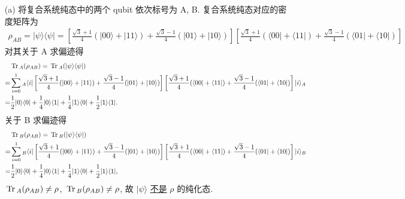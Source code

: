 \documentclass{assignment}
\begin{document}
\begin{sol}
    \begin{itemize}
        \item[(a)] 将复合系统纯态中的两个 qubit 依次标号为 A, B. 复合系统纯态对应的密度矩阵为
        \begin{align}
            \rho_{AB}=\lvert\psi\rangle\langle\psi\rvert=\left[\frac{\sqrt{3}+1}{4}(\lvert 00\rangle+\lvert 11\rangle)+\frac{\sqrt{3}-1}{4}(\lvert 01\rangle+\lvert 10\rangle)\right]\left[\frac{\sqrt{3}+1}{4}(\langle 00\rvert+\langle 11\rvert)+\frac{\sqrt{3}-1}{4}(\langle 01\rvert+\langle 10\rvert)\right]
        \end{align}
        对其关于 A 求偏迹得
        \begin{align}
            \notag&\,\mathrm{Tr}\,_A(\rho_{AB})=\,\mathrm{Tr}\,_A(\lvert\psi\rangle\langle\psi\rvert)\\
            \notag=&\sum_{i=0}^1{}_A\langle i\rvert\left[\frac{\sqrt{3}+1}{4}(\lvert 00\rangle+\lvert 11\rangle)+\frac{\sqrt{3}-1}{4}(\lvert 01\rangle+\lvert 10\rangle)\right]\left[\frac{\sqrt{3}+1}{4}(\langle 00\rvert+\langle 11\rvert)+\frac{\sqrt{3}-1}{4}(\langle 01\rvert+\langle 10\rvert)\right]\lvert i\rangle_A\\
            =&\frac{1}{2}\lvert 0\rangle\langle 0\rvert+\frac{1}{4}\lvert 0\rangle\langle 1\rvert+\frac{1}{4}\lvert 1\rangle\langle 0\rvert+\frac{1}{2}\lvert 1\rangle\langle 1\rvert.
        \end{align}
        关于 B 求偏迹得
        \begin{align}
            \notag&\,\mathrm{Tr}\,_B(\rho_{AB})=\,\mathrm{Tr}\,_B(\lvert\psi\rangle\langle\psi\rvert)\\
            \notag=&\sum_{i=0}^1{}_B\langle i\rvert\left[\frac{\sqrt{3}+1}{4}(\lvert 00\rangle+\lvert 11\rangle)+\frac{\sqrt{3}-1}{4}(\lvert 01\rangle+\lvert 10\rangle)\right]\left[\frac{\sqrt{3}+1}{4}(\langle 00\rvert+\langle 11\rvert)+\frac{\sqrt{3}-1}{4}(\langle 01\rvert+\langle 10\rvert)\right]\lvert i\rangle_B\\
            =&\frac{1}{2}\lvert 0\rangle\langle 0\rvert+\frac{1}{4}\lvert 0\rangle\langle 1\rvert+\frac{1}{4}\lvert 1\rangle\langle 0\rvert+\frac{1}{2}\lvert 1\rangle\langle 1\rvert,
        \end{align}
        $\,\mathrm{Tr}\,_A(\rho_{AB})\neq\rho$, $\,\mathrm{Tr}\,_B(\rho_{AB})\neq\rho$, 故 $\lvert\psi\rangle$ \uline{不是} $\rho$ 的纯化态.


\end{itemize}
\end{sol}
\end{document}
